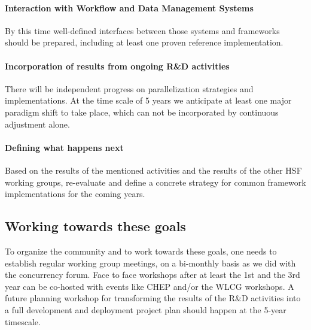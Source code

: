 \documentclass[12pt,a4paper]{article}
\begin{document}
\paragraph{Interaction with Workflow and Data Management Systems} By
this time well-defined interfaces between those systems and frameworks
should be prepared, including at least one proven reference
implementation.

\paragraph{Incorporation of results from ongoing R\&D activities}
There will be independent progress on parallelization strategies and
implementations. At the time scale of 5 years we anticipate at least
one major paradigm shift to take place, which can not be incorporated
by continuous adjustment alone.

\paragraph{Defining what happens next} Based on the results of the
mentioned activities and the results of the other HSF working groups,
re-evaluate and define a concrete strategy for common framework
implementations for the coming years.

\subsection{Working towards these goals}
\label{sec:towards-goals}

To organize the community and to work towards these goals, one needs
to establish regular working group meetings, on a bi-monthly basis as
we did with the concurrency forum. Face to face workshops after at
least the 1st and the 3rd year can be co-hosted with events like CHEP
and/or the WLCG workshops. A future planning workshop for transforming
the results of the R\&D activities into a full development and
deployment project plan should happen at the 5-year timescale.


\sloppy
\raggedright
\clearpage
\printbibliography[title={References},heading=bibintoc]
\end{document}
